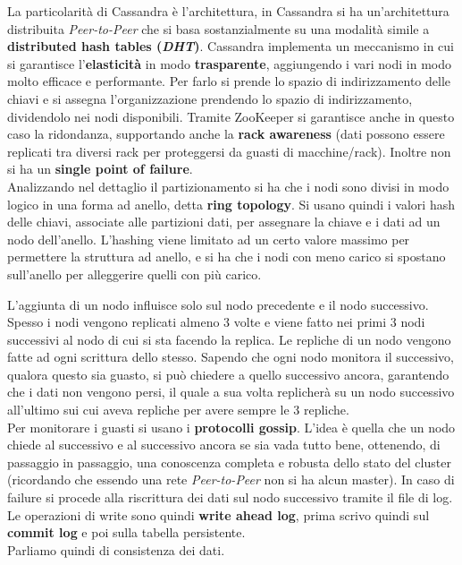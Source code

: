 La particolarità di Cassandra è l'architettura, in Cassandra si ha un'architettura distribuita \textit{Peer-to-Peer} che si basa sostanzialmente su una modalità simile a \textbf{distributed hash tables (\textit{DHT})}. Cassandra  implementa un meccanismo in cui si garantisce l'\textbf{elasticità} in modo \textbf{trasparente}, aggiungendo i vari nodi in modo molto efficace e performante. Per farlo si prende lo spazio di indirizzamento delle chiavi e si assegna l'organizzazione prendendo lo spazio di indirizzamento, dividendolo nei nodi disponibili. Tramite ZooKeeper si garantisce anche in questo caso la ridondanza, supportando anche la \textbf{rack awareness} (dati possono essere replicati tra diversi rack per proteggersi da guasti di macchine/rack). Inoltre non si ha un \textbf{single point of failure}.\\
Analizzando nel dettaglio il partizionamento si ha che i nodi sono divisi in modo logico in una forma ad anello, detta \textbf{ring topology}. Si usano quindi i valori hash delle chiavi, associate alle partizioni dati, per assegnare la chiave e i dati ad un nodo dell'anello. L'hashing viene limitato ad un certo valore massimo per permettere la struttura ad anello, e si ha che i nodi con meno carico si spostano sull'anello per alleggerire quelli con più carico.

L'aggiunta di un nodo influisce solo sul nodo precedente e il nodo successivo. Spesso i nodi vengono replicati almeno 3 volte e viene fatto nei primi 3 nodi successivi al nodo di cui si sta facendo la replica. Le repliche di un nodo vengono fatte ad ogni scrittura dello stesso. Sapendo che ogni nodo monitora il successivo, qualora questo sia guasto, si può chiedere a quello successivo ancora, garantendo che i dati non vengono persi, il quale a sua volta replicherà su un nodo successivo all'ultimo sui cui aveva repliche per avere sempre le 3 repliche. \\ 
Per monitorare i guasti si usano i \textbf{protocolli gossip}. L'idea è quella che un nodo chiede al successivo e al successivo ancora se sia vada tutto bene, ottenendo, di passaggio in passaggio, una conoscenza completa e robusta dello stato del cluster (ricordando che essendo una rete \textit{Peer-to-Peer} non si ha alcun master). In caso di failure si procede alla riscrittura dei dati sul nodo successivo tramite il file di log.\\ Le operazioni di write sono quindi \textbf{write ahead log}, prima scrivo quindi sul \textbf{commit log} e poi sulla tabella persistente.\\ Parliamo quindi di consistenza dei dati.\\ 

